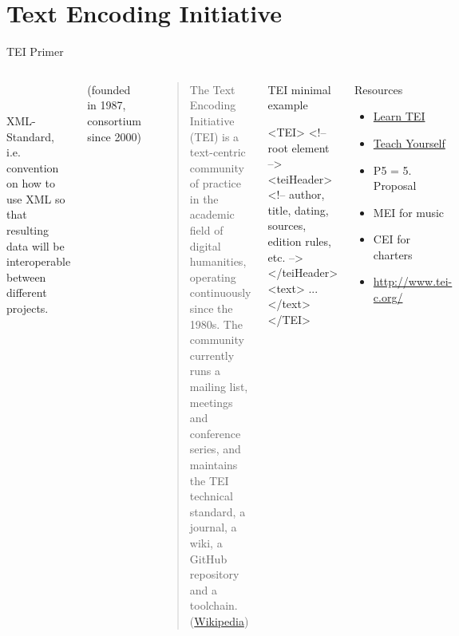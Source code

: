 


\section{Text Encoding Initiative}
\begin{frame}[fragile]{TEI Primer}
\footnotesize{}

\begin{columns}
\\
\\
XML-Standard, i.e. convention on how to use XML so that resulting data will be interoperable between different projects.

(founded in 1987, consortium since 2000)

\begin{block}{}
\begin{quote}
    The Text Encoding Initiative (TEI) is a text-centric community of practice in the academic field of digital humanities, operating continuously since the 1980s. The community currently runs a mailing list, meetings and conference series, and maintains the TEI technical standard, a journal, a wiki, a GitHub repository and a toolchain. (\href{https://en.wikipedia.org/wiki/Text_Encoding_Initiative}{Wikipedia})
\end{quote}
\end{block}

\begin{block}{TEI minimal example}
\begin{xmlcode}
<TEI> <!-- root element -->
    <teiHeader> 
      <!-- author, title, dating, 
           sources, edition rules, etc. -->
    </teiHeader> 
    <text> ... </text>
</TEI>
\end{xmlcode}
\end{block}

\begin{block}{Resources}
    \begin{itemize}\scriptsize
        \item \href{http://www.tei-c.org/Support/Learn/}{Learn TEI} 
        \item \href{http://www.tei-c.org/support/learn/teach-yourself-tei/}{Teach Yourself} \item P5 = 5. Proposal 
        \item MEI for music 
        \item CEI for charters 
        \item \href{http://www.tei-c.org/}{http://www.tei-c.org/} 
    \end{itemize}
\end{block}
\end{columns}

\end{frame}

